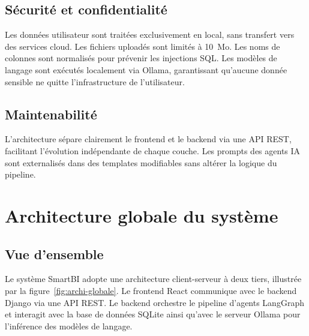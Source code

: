 \subsection{Sécurité et confidentialité}

Les données utilisateur sont traitées exclusivement en local, sans transfert vers des services cloud. Les fichiers uploadés sont limités à 10~Mo. Les noms de colonnes sont normalisés pour prévenir les injections SQL. Les modèles de langage sont exécutés localement via Ollama, garantissant qu'aucune donnée sensible ne quitte l'infrastructure de l'utilisateur.

\subsection{Maintenabilité}

L'architecture sépare clairement le frontend et le backend via une API REST, facilitant l'évolution indépendante de chaque couche. Les prompts des agents IA sont externalisés dans des templates modifiables sans altérer la logique du pipeline.

\section{Architecture globale du système}

\subsection{Vue d'ensemble}

Le système SmartBI adopte une architecture client-serveur à deux tiers, illustrée par la figure~\ref{fig:archi-globale}. Le frontend React communique avec le backend Django via une API REST. Le backend orchestre le pipeline d'agents LangGraph et interagit avec la base de données SQLite ainsi qu'avec le serveur Ollama pour l'inférence des modèles de langage.

